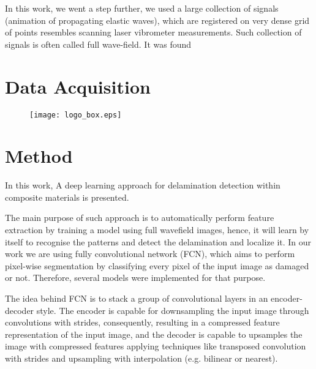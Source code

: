 \documentclass[preprint,10pt]{elsarticle}
\begin{document}
In this work, we went a step further, we used a large collection of signals (animation of propagating elastic waves), which are registered on very dense grid of points resembles scanning laser vibrometer measurements. Such collection of signals is often called full wave-field. 
It was found
\section{Data Acquisition}
	
\begin{figure}
	\texttt{[image: logo\_box.eps]}
\end{figure}
\section*{ }
%

\section{Method}

In this work, A deep learning approach for delamination detection within composite materials is presented. 

The main purpose of such approach is to automatically perform feature extraction by training a model using full wavefield images, hence, it will learn by itself to recognise the patterns and detect the delamination and localize it.
In our work we are using fully convolutional network (FCN), which aims to perform pixel-wise segmentation by classifying every pixel of the input image as damaged or not. 
Therefore, several models were implemented for that purpose.

The idea behind FCN is to stack a group of convolutional layers in an encoder-decoder style. 
The encoder is capable for downsampling the input image through convolutions with strides, consequently, resulting in a compressed feature representation of the input image, and the decoder is capable to upsamples the image with compressed features applying techniques like transposed convolution with strides and upsampling with interpolation (e.g. bilinear or nearest).
\end{document}
